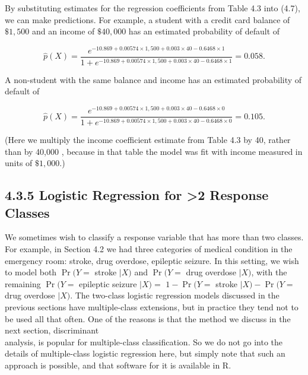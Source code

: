 \documentclass[10pt]{article}
\begin{document}
By substituting estimates for the regression coefficients from Table 4.3 into (4.7), we can make predictions. For example, a student with a credit card balance of $\$ 1,500$ and an income of $\$ 40,000$ has an estimated probability of default of


\begin{equation*}
\hat{p}(X)=\frac{e^{-10.869+0.00574 \times 1,500+0.003 \times 40-0.6468 \times 1}}{1+e^{-10.869+0.00574 \times 1,500+0.003 \times 40-0.6468 \times 1}}=0.058 . \tag{4.8}
\end{equation*}


A non-student with the same balance and income has an estimated probability of default of


\begin{equation*}
\hat{p}(X)=\frac{e^{-10.869+0.00574 \times 1,500+0.003 \times 40-0.6468 \times 0}}{1+e^{-10.869+0.00574 \times 1,500+0.003 \times 40-0.6468 \times 0}}=0.105 . \tag{4.9}
\end{equation*}


(Here we multiply the income coefficient estimate from Table 4.3 by 40, rather than by 40,000 , because in that table the model was fit with income measured in units of $\$ 1,000$.)

\subsection*{4.3.5 Logistic Regression for >2 Response Classes}
We sometimes wish to classify a response variable that has more than two classes. For example, in Section 4.2 we had three categories of medical condition in the emergency room: stroke, drug overdose, epileptic seizure. In this setting, we wish to model both $\operatorname{Pr}(Y=$ stroke $\mid X)$ and $\operatorname{Pr}(Y=$ drug overdose $\mid X)$, with the remaining $\operatorname{Pr}(Y=$ epileptic seizure $\mid X)=$ $1-\operatorname{Pr}(Y=$ stroke $\mid X)-\operatorname{Pr}(Y=$ drug overdose $\mid X)$. The two-class logistic regression models discussed in the previous sections have multiple-class extensions, but in practice they tend not to be used all that often. One of the reasons is that the method we discuss in the next section, discriminant\\
analysis, is popular for multiple-class classification. So we do not go into the details of multiple-class logistic regression here, but simply note that such an approach is possible, and that software for it is available in R.
\end{document}
